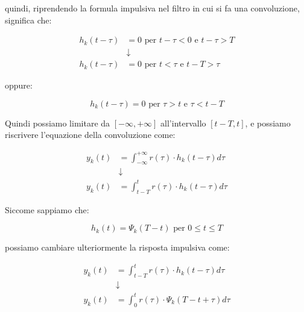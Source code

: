 quindi, riprendendo la formula impulsiva nel filtro in cui si fa una convoluzione, significa che: 

{
    \Large 
    \begin{equation}
        \begin{split}
            h_k (t -\tau) &= 0 \text{ per } t - \tau < 0 \text{ e } t - \tau > T
            \\
            &\downarrow
            \\
            h_k (t -\tau) &= 0 \text{ per } t  < \tau \text{ e } t - T  >  \tau
        \end{split}
    \end{equation}
}

oppure: 

{
    \Large 
    \begin{equation}
        h_k (t -\tau) = 0 \text{ per } \tau > t \text{ e }  \tau <  t - T  
    \end{equation}
}

Quindi possiamo limitare da $[-\infty, + \infty]$ all'intervallo $[t - T, t]$, 
e possiamo riscrivere l'equazione della convoluzione come: 

{
    \Large 
    \begin{equation}
        \begin{split}
        y_k (t)
        &= 
        \int_{- \infty}^{+ \infty}
        r(\tau) \cdot h_k (t-\tau) d\tau
       \\
       &\downarrow 
       \\ 
        y_k (t)
        &= 
        \int_{t - T}^{t}
        r(\tau) \cdot h_k (t-\tau) d\tau
    \end{split}
    \end{equation}
}

Siccome sappiamo che: 

{
    \Large 
    \begin{equation}
        h_k (t) = \Psi_k (T - t) \text{ per } 0 \le t \le T
    \end{equation}
}

possiamo cambiare ulteriormente la risposta impulsiva come: 

{
    \Large 
    \begin{equation}
        \begin{split}
            y_k (t)
        &= 
        \int_{t - T}^{t}
        r(\tau) \cdot h_k (t-\tau) d\tau
        \\
        &\downarrow
        \\ 
         y_k (t)
        &= 
        \int_{0}^{t}
        r(\tau) \cdot \Psi_k (T - t + \tau) d\tau
        \end{split}
    \end{equation}
}

